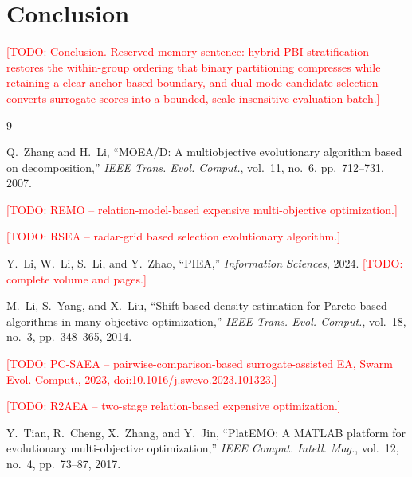 \documentclass[11pt,a4paper]{article}
\newcommand{\TODO}[1]{\textcolor{red}{[TODO: #1]}}
\begin{document}
\section{Conclusion}
\label{sec:conclusion}
\TODO{Conclusion. Reserved memory sentence: hybrid PBI stratification restores
the within-group ordering that binary partitioning compresses while retaining a
clear anchor-based boundary, and dual-mode candidate selection converts surrogate
scores into a bounded, scale-insensitive evaluation batch.}

\begin{thebibliography}{9}

Q.~Zhang and H.~Li,
``MOEA/D: A multiobjective evolutionary algorithm based on decomposition,''
\emph{IEEE Trans. Evol. Comput.}, vol.~11, no.~6, pp.~712--731, 2007.

\TODO{REMO -- relation-model-based expensive multi-objective optimization.}

\TODO{RSEA -- radar-grid based selection evolutionary algorithm.}

Y.~Li, W.~Li, S.~Li, and Y.~Zhao,
``PIEA,'' \emph{Information Sciences}, 2024.
\TODO{complete volume and pages.}

M.~Li, S.~Yang, and X.~Liu,
``Shift-based density estimation for Pareto-based algorithms in
many-objective optimization,''
\emph{IEEE Trans. Evol. Comput.}, vol.~18, no.~3, pp.~348--365, 2014.

\TODO{PC-SAEA -- pairwise-comparison-based surrogate-assisted EA,
Swarm Evol. Comput., 2023, doi:10.1016/j.swevo.2023.101323.}

\TODO{R2AEA -- two-stage relation-based expensive optimization.}

Y.~Tian, R.~Cheng, X.~Zhang, and Y.~Jin,
``PlatEMO: A MATLAB platform for evolutionary multi-objective optimization,''
\emph{IEEE Comput. Intell. Mag.}, vol.~12, no.~4, pp.~73--87, 2017.

\end{thebibliography}
\end{document}
